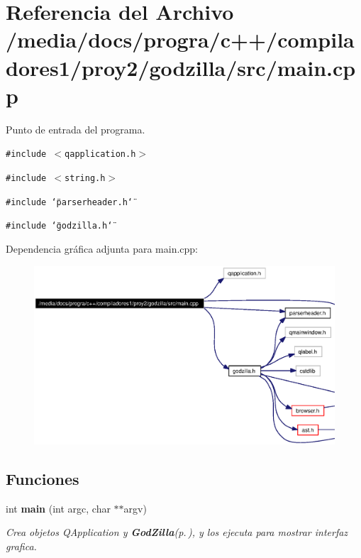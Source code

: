\section{Referencia del Archivo /media/docs/progra/c++/compiladores1/proy2/godzilla/src/main.cpp}
\label{main_8cpp}
Punto de entrada del programa. 

{\tt \#include $<$qapplication.h$>$}\par
{\tt \#include $<$string.h$>$}\par
{\tt \#include \char`\"{}parserheader.h\char`\"{}}\par
{\tt \#include \char`\"{}godzilla.h\char`\"{}}\par


Dependencia gr\'{a}fica adjunta para main.cpp:\begin{figure}[H]
\begin{center}
\leavevmode
\includegraphics[width=396pt]{main_8cpp__incl}
\end{center}
\end{figure}
\subsection*{Funciones}
\begin{CompactItemize}
\item 
int {\bf main} (int argc, char $\ast$$\ast$argv)
\begin{CompactList}\small\item\em Crea objetos QApplication y {\bf God\-Zilla}{\rm (p.\,\pageref{classGodZilla})}, y los ejecuta para mostrar interfaz grafica. \item\end{CompactList}\end{CompactItemize}


